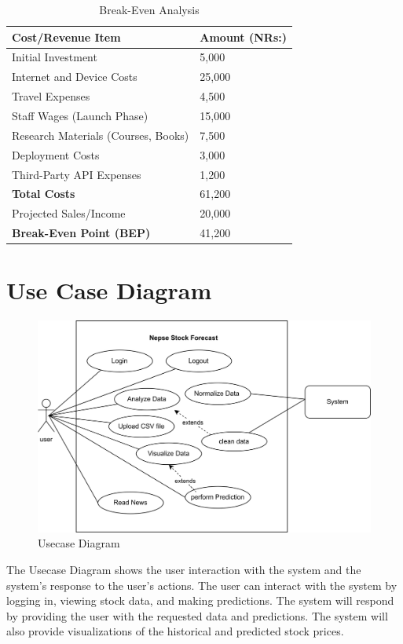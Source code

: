 \documentclass[./main.tex]{subfiles}
\begin{document}
\begin{center}

\begin{table}[H]
\begin{tabularx}{\textwidth}{|X|X|}
\hline
\textbf{Cost/Revenue Item} & \textbf{Amount (NRs:)} \\
\hline
Initial Investment & 5,000 \\
Internet and Device Costs & 25,000 \\
Travel Expenses & 4,500 \\
Staff Wages (Launch Phase) & 15,000 \\
Research Materials (Courses, Books) & 7,500 \\
Deployment Costs & 3,000 \\
Third-Party API Expenses & 1,200 \\
\hline
\textbf{Total Costs} & 61,200 \\
\hline
Projected Sales/Income & 20,000 \\
\hline
\textbf{Break-Even Point (BEP)} & 41,200 \\
\hline
\end{tabularx}
\caption{Break-Even Analysis}
\end{table}
\end{center}
\newpage
\section{Use Case Diagram}

\begin{figure}[H]
     \centering
     \includegraphics[width=1\linewidth]{images/Mideterm.png}
     \caption{Usecase Diagram}
     \label{fig:3.2}
 \end{figure}

 The Usecase Diagram shows the user interaction with the system and the system's response to the user's actions. The user can interact with the system by logging in, viewing stock data, and making predictions. The system will respond by providing the user with the requested data and predictions. The system will also provide visualizations of the historical and predicted stock prices.
\end{document}
